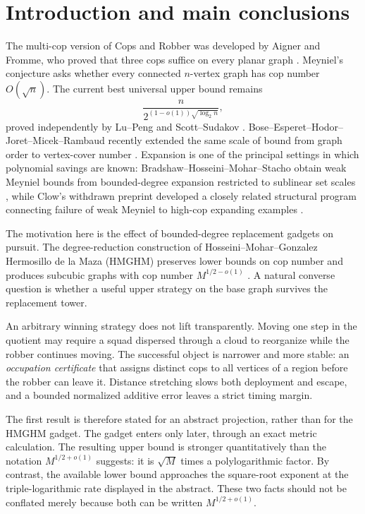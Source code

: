 \documentclass[11pt]{amsart}
\theoremstyle{definition}
\begin{document}
\section{Introduction and main conclusions}

The multi-cop version of Cops and Robber was developed by Aigner and Fromme,
who proved that three cops suffice on every planar graph
\cite{AignerFromme}.  Meyniel's conjecture asks whether every connected
$n$-vertex graph has cop number $O(\sqrt n)$.  The current best universal
upper bound remains
\[
 \frac{n}{2^{(1-o(1))\sqrt{\log_2 n}}},
\]
proved independently by Lu--Peng and Scott--Sudakov
\cite{LuPeng,ScottSudakov}.  Bose--Esperet--Hodor--Joret--Micek--Rambaud
recently extended the same scale of bound from graph order to vertex-cover
number \cite{CurrentFrontier}.  Expansion is one of the principal settings in
which polynomial savings are known: Bradshaw--Hosseini--Mohar--Stacho obtain
weak Meyniel bounds from bounded-degree expansion restricted to sublinear set
scales \cite{BHMS}, while Clow's withdrawn preprint developed a closely
related structural program connecting failure of weak Meyniel to high-cop
expanding examples \cite{Clow}.

The motivation here is the effect of bounded-degree replacement gadgets on
pursuit.  The degree-reduction construction of Hosseini--Mohar--Gonzalez
Hermosillo de la Maza (HMGHM) preserves lower bounds on cop number and
produces subcubic graphs with cop number $M^{1/2-o(1)}$ \cite{HMGHM}.  A
natural converse question is whether a useful upper strategy on the base
graph survives the replacement tower.

An arbitrary winning strategy does not lift transparently.  Moving one step
in the quotient may require a squad dispersed through a cloud to reorganize
while the robber continues moving.  The successful object is narrower and
more stable: an \emph{occupation certificate} that assigns distinct cops to
all vertices of a region before the robber can leave it.  Distance stretching
slows both deployment and escape, and a bounded normalized additive error
leaves a strict timing margin.

The first result is therefore stated for an abstract projection, rather than
for the HMGHM gadget.  The gadget enters only later, through an exact metric
calculation.  The resulting upper bound is stronger quantitatively than the
notation $M^{1/2+o(1)}$ suggests: it is $\sqrt M$ times a polylogarithmic
factor.  By contrast, the available lower bound approaches the square-root
exponent at the triple-logarithmic rate displayed in the abstract.  These two
facts should not be conflated merely because both can be written
$M^{1/2+o(1)}$.
\end{document}
